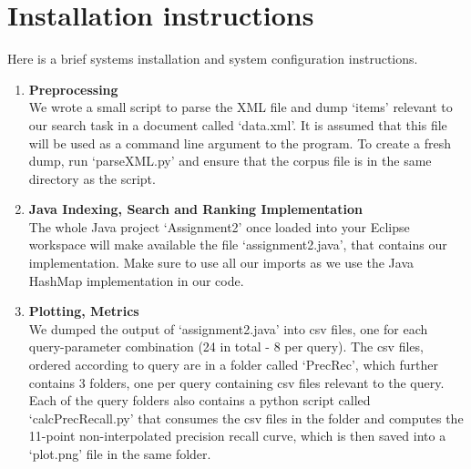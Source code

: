 

\clearpage

\nocite{*}




\clearpage
\appendix
\section{Installation instructions} \label{App:instructions}

Here is a brief systems installation and system configuration instructions. 

\begin{enumerate}

\item {\bf Preprocessing} \\
We wrote a small script to parse the XML file and dump \lq items' relevant to our search task
in a document called \lq data.xml'. It is assumed that this file will be used as a command line
argument to the program. To create a fresh dump, run \lq parseXML.py' and ensure that the corpus
file is in the same directory as the script. 
\item {\bf Java Indexing, Search and Ranking Implementation} \\
The whole Java project \lq Assignment2' once loaded into your Eclipse workspace
will make available the file \lq assignment2.java', that contains our implementation. 
Make sure to use all our imports as we use the Java HashMap implementation in our code.
\item {\bf Plotting, Metrics} \\
We dumped the output of \lq assignment2.java' into csv files, one for each query-parameter
combination (24 in total - 8 per query). The csv files, ordered according to query are in
a folder called \lq PrecRec', which further contains 3 folders, one per query containing csv
files relevant to the query. Each of the query folders also contains a python script called \lq calcPrecRecall.py\rq 
that consumes the csv files in the folder and computes the 11-point non-interpolated precision recall curve,
which is then saved into a \lq plot.png' file in the same folder. 
\end{enumerate}


